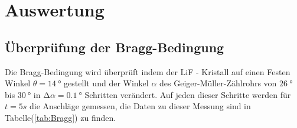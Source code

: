 \section{Auswertung}

    \subsection{Überprüfung der Bragg-Bedingung}

        \noindent Die Bragg-Bedingung wird überprüft indem der LiF - Kristall auf einen Festen Winkel $\theta = \SI{14}{\degree}$ gestellt und der Winkel
        $\alpha$ des Geiger-Müller-Zählrohrs von $\SI{26}{\degree}$ bis $\SI{30}{\degree}$ in $\increment \alpha = \SI{0.1}{\degree}$ Schritten 
        verändert. Auf jeden dieser Schritte werden für $t = 5s$ die Anschläge gemessen, die Daten zu dieser Messung sind in Tabelle(\ref{tab:Bragg}) 
        zu finden.

